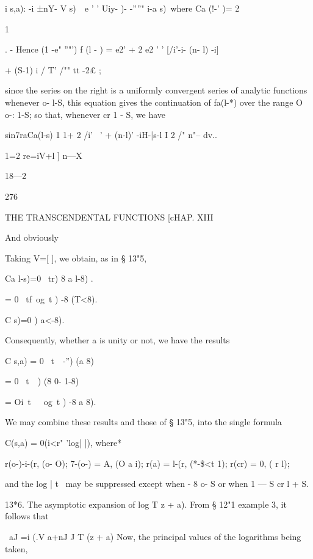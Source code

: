 {{i s,a): -i ±nY- V  s)\ \  e ' ' Uiy- )- -''''" i-a  s)\ 
where Ca (!-' )= 2 



1 %

. -   
Hence (1 -e" ''"') f (l - ) = e2'  + 2 e2 ' '  [/i'-i- (n- l) -i] 



+ (S-1) i / T' /"" tt -2£ ; 



since the series on the right is a uniformly convergent series of analytic functions 
whenever o- l-S, this equation gives the continuation of fa(l-*) over the range 
O o-: 1-S; so that, whenever cr   1 - S, we have 

sin7raCa(l-s) 1 1+ 2  /i' ~' + (n-l)' -iH-|s-l I 2 /" n"-- dv.. 

1=2 re=iV+l ] n—X 

18—2 



276 



THE TRANSCENDENTAL FUNCTIONS [cHAP. XIII 



And obviously 



Taking  V=[ ], we obtain, as in § 13"5, 

Ca l-s)=0 \ tr)  8 a l-8) . 

= 0 \ tf\ og\ t )   -8 (T<8). 

C   s)=0  )   a<-8). 

Consequently, whether a is unity or not, we have the results 

C s,a) = 0 \ t\ \  -'') (a  8) 

= 0 \ t\ \  ) (8 0- 1-8) 

= Oi\ t\ \  \ og\ t )   -8 a 8). 

We may combine these results and those of § 13"5, into the single formula 

C(s,a) = 0(i<r" 'log| |), 
where* 

r(o-)-i-(r, (o- O); 7-(o-) = A, (O a i); r(a) = l-(r, (*-\$<t 1); r(cr) = 0, ( r l); 

and the log | t \ may be suppressed except when - 8   o-   S or when 1 — S cr l + S. 

13*6. The asymptotic expansion of log T  z + a). 
From § 12"1 example 3, it follows that 

\ aJ  =i (.V a+nJ J T (z + a) 
Now, the principal values of the logarithms being taken, 



}}
